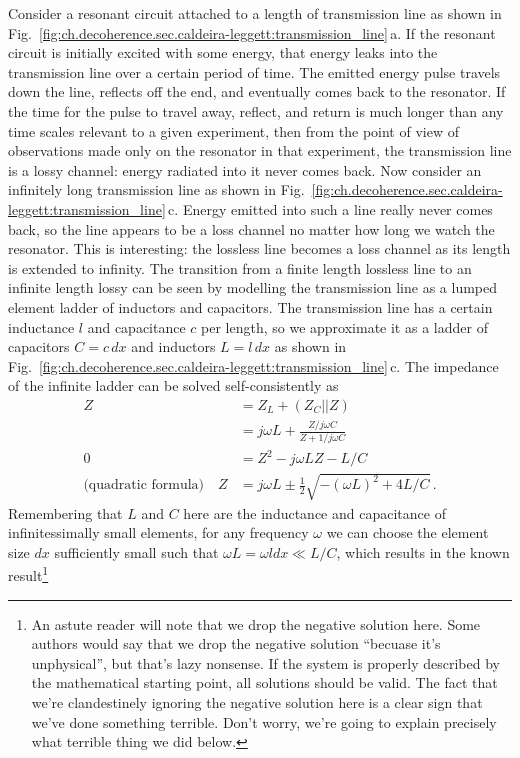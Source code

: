 Consider a resonant circuit attached to a length of transmission line as shown in Fig.~\ref{fig:ch.decoherence.sec.caldeira-leggett:transmission_line}\,a.
If the resonant circuit is initially excited with some energy, that energy leaks into the transmission line over a certain period of time.
The emitted energy pulse travels down the line, reflects off the end, and eventually comes back to the resonator.
If the time for the pulse to travel away, reflect, and return is much longer than any time scales relevant to a given experiment, then from the point of view of observations made only on the resonator in that experiment, the transmission line is a lossy channel: energy radiated into it never comes back.
Now consider an infinitely long transmission line as shown in Fig.~\ref{fig:ch.decoherence.sec.caldeira-leggett:transmission_line}\,c.
Energy emitted into such a line really never comes back, so the line appears to be a loss channel no matter how long we watch the resonator.
This is interesting: the lossless line becomes a loss channel as its length is extended to infinity.
The transition from a finite length lossless line to an infinite length lossy can be seen by modelling the transmission line as a lumped element ladder of inductors and capacitors.
The transmission line has a certain inductance $\mathit{l}$ and capacitance $\mathit{c}$ per length, so we approximate it as a ladder of capacitors $C = \mathit{c} \, dx$ and inductors $L = \mathit{l} \, dx$ as shown in Fig.~\ref{fig:ch.decoherence.sec.caldeira-leggett:transmission_line}\,c.
The impedance of the infinite ladder can be solved self-consistently as
\begin{align}
  Z
  &= Z_L + \left( Z_C || Z \right) \nonumber \\
  &= j \omega L + \frac{Z / j \omega C}{Z + 1/ j \omega C} \nonumber \\
  0 &= Z^2 - j \omega L Z - L / C \nonumber \\
  \text{(quadratic formula)} \quad Z &= j \omega L \pm \frac{1}{2} \sqrt{-(\omega L)^2 + 4 L / C}
  \, .
\end{align}
Remembering that $L$ and $C$ here are the inductance and capacitance of infinitessimally small elements, for any frequency $\omega$ we can choose the element size $dx$ sufficiently small such that $\omega L = \omega \mathit{l} dx \ll L/C$, which results in the known result\footnote{An astute reader will note that we drop the negative solution here. Some authors would say that we drop the negative solution ``becuase it's unphysical'', but that's lazy nonsense. If the system is properly described by the mathematical starting point, all solutions should be valid. The fact that we're clandestinely ignoring the negative solution here is a clear sign that we've done something terrible. Don't worry, we're going to explain precisely what terrible thing we did below.}
